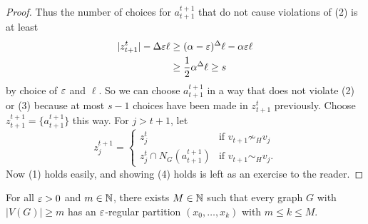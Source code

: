 \documentclass[main.tex]{subfiles}
\begin{document}
\begin{proof}
  Thus the number of choices for $a_{t+1}^{t+1}$ that do not cause violations of
  (2) is at least
  \begin{align*}
    |z_{t+1}^t| - \Delta\varepsilon\ell&\geq(\alpha-\varepsilon)^\Delta\ell-\alpha\varepsilon\ell \\
                                &\geq\frac{1}{2}\alpha^\Delta\ell\geq s
  \end{align*}
  by choice of $\varepsilon$ and $\ell$.
  So we can choose $a_{t+1}^{t+1}$ in a way that does not violate (2) or (3) because
  at most $s-1$ choices have been made in $z_{t+1}^t$ previously.
  Choose $z_{t+1}^{t+1} = \{a_{t+1}^{t+1}\}$ this way.
  For $j > t+1$, let
  \[
    z_j^{t+1} = \begin{cases}
      z_j^t & \text{if }v_{t+1}\not\sim_H v_j \\
      z_j^t\cap N_G(a_{t+1}^{t+1}) & \text{if } v_{t+1}\sim_H v_j.
    \end{cases}
  \]
  Now (1) holds easily, and showing (4) holds is left as an exercise to the
  reader.
\end{proof}
\begin{recall*}
  For all $\varepsilon > 0$ and $m\in\mathbb N$, there exists $M\in\mathbb N$ such that every graph
  $G$ with $|V(G)|\geq m$ has an $\varepsilon$-regular partition
  $(x_0,\ldots,x_k)$ with $m\leq k\leq M$.
\end{recall*}
\end{document}
